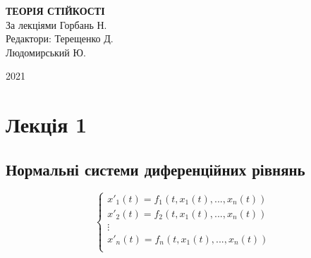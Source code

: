 \documentclass[14pt,a4paper]{scrartcl}
\theoremstyle{definition}
\newtheorem*{defo}{Означення}
\theoremstyle{remark}
\theoremstyle{definition}
\theoremstyle{definition}
\begin{document}
\def\be{\begin{equation}}
\def\ee{\end{equation}}

\def\bd{\begin{defo}}
\def\ed{\end{defo}}

\def\bbt{\begin{boxteo}}
\def\ebt{\end{boxteo}}

\def\i{\infty}
\def\d{\partial}

\def\vx{\overline{x}}
\def\vphi{\overline{\varphi}}
\def\vf{\overline{f}}

\begin{titlepage}
\begin{center}

\vspace*{0.1cm}
\vfill

{\huge \textbf{ТЕОРІЯ СТІЙКОСТІ}}\\
\vspace{5cm}
За лекціями Горбань Н.\\
\vspace{1cm}
Редактори: Терещенко Д.\\ \hspace{3.7cm} Людомирський Ю.

\vfill

2021

\end{center}
\end{titlepage}


\tableofcontents
\newpage

\section{Лекція 1}
\subsection{Нормальні системи диференційних рівнянь}


\be
\left\lbrace
\begin{gathered}
    x'_1 (t) = f_1(t, x_1 (t), ... , x_n(t)) \\
    x'_2 (t) = f_2(t, x_1 (t), ... , x_n(t)) \\
    \vdots \\
    x'_n (t) = f_n(t, x_1 (t), ... , x_n(t)) \\
\end{gathered}\right.
\ee
\end{document}
